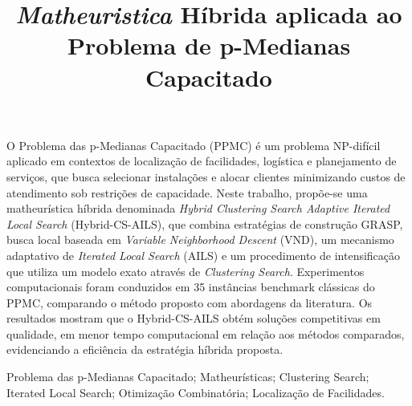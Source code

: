 \documentclass[a4paper,11pt]{article}
\begin{document}
\title{\textit{Matheuristica} Híbrida aplicada ao Problema de p-Medianas Capacitado} 

\maketitle
\thispagestyle{fancy}

\author{ 
}

\vspace{8mm}
\begin{resumo}
O Problema das p-Medianas Capacitado (PPMC) é um problema NP-difícil aplicado em contextos de localização de facilidades, logística e planejamento de serviços, que busca selecionar instalações e alocar clientes minimizando custos de atendimento sob restrições de capacidade. Neste trabalho, propõe-se uma matheurística híbrida denominada \textit{Hybrid Clustering Search Adaptive Iterated Local Search} (Hybrid-CS-AILS), que combina estratégias de construção GRASP, busca local baseada em \textit{Variable Neighborhood Descent} (VND), um mecanismo adaptativo de \textit{Iterated Local Search} (AILS) e um procedimento de intensificação que utiliza um modelo exato através de \textit{Clustering Search}. Experimentos computacionais foram conduzidos em 35 instâncias benchmark clássicas do PPMC, comparando o método proposto com abordagens da literatura. Os resultados mostram que o Hybrid-CS-AILS obtém soluções competitivas em qualidade, em menor tempo computacional em relação aos métodos comparados, evidenciando a eficiência da estratégia híbrida proposta.
\end{resumo}

\bigskip
\begin{palchaves}
Problema das p-Medianas Capacitado; Matheurísticas; Clustering Search; Iterated Local Search; Otimização Combinatória; Localização de Facilidades.

\end{palchaves}



\vspace{8mm}
\end{document}
